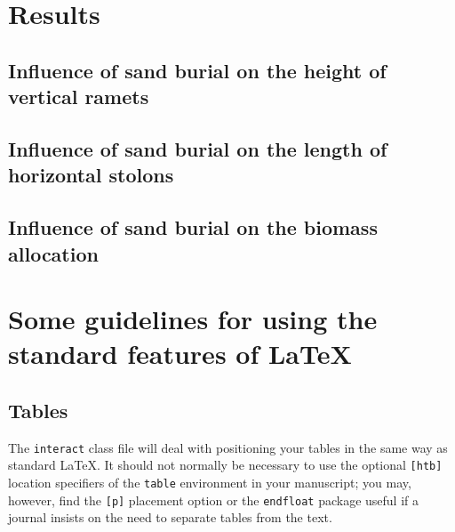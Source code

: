 \documentclass[]{interact}
\theoremstyle{plain}%
\theoremstyle{definition}
\theoremstyle{remark}
\begin{document}
\section{Results}

\subsection{Influence of sand burial on the height of vertical ramets}


\subsection{Influence of sand burial on the length of horizontal stolons}


\subsection{Influence of sand burial on the biomass allocation}


\section{Some guidelines for using the standard features of \LaTeX}


\subsection{Tables}

The \texttt{interact} class file will deal with positioning your tables in the same way as standard \LaTeX. It should not normally be necessary to use the optional \texttt{[htb]} location specifiers of the \texttt{table} environment in your manuscript; you may, however, find the \verb"[p]" placement option or the \verb"endfloat" package useful if a journal insists on the need to separate tables from the text.
\end{document}
